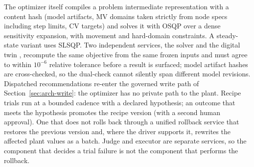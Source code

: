 The optimizer itself compiles a problem intermediate representation with a
content hash (model artifacts, MV domains taken strictly from node specs
including step limits, CV targets) and solves it with OSQP over a dense
sensitivity expansion, with movement and hard-domain constraints. A
steady-state variant uses SLSQP. Two independent services, the solver
and the digital twin \cite{jones2020characterising}, recompute the same
objective from the same frozen
inputs and must agree to within $10^{-6}$ relative tolerance before a
result is surfaced; model artifact hashes are cross-checked, so the
dual-check cannot silently span different model revisions. Dispatched
recommendations re-enter the governed write path of
Section~\ref{sec:arch-write}: the optimizer has no private path to the
plant. Recipe trials run at a bounded cadence with a declared hypothesis;
an outcome that meets the hypothesis promotes the recipe version (with a
second human approval). One that does not rolls back through a
unified rollback service that restores the previous version and, where the
driver supports it, rewrites the affected plant values as a batch. Judge
and executor are separate services, so the component that decides a trial
failure is not the component that performs the rollback.
